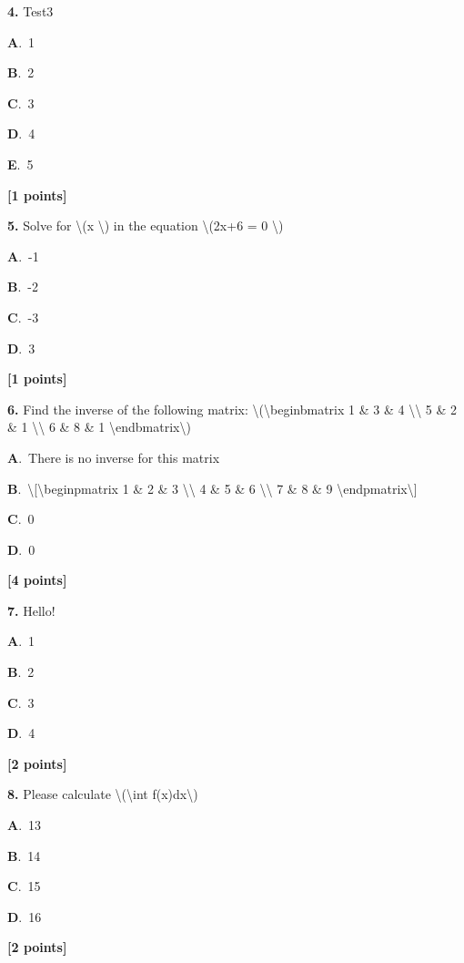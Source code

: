 \documentclass[12pt]{article}
\newcommand{\choice}[3]{%
  \noindent\textbf{#1}.~#2\hfill#3\par\vspace{0.25em}
}
\begin{document}
\noindent \textbf{\textenglish{4.}} {\textenglish{Test3}}

\noindent\choice{A}{{\textenglish{1}}}{}
\noindent\choice{B}{{\textenglish{2}}}{}
\noindent\choice{C}{{\textenglish{3}}}{}
\noindent\choice{D}{{\textenglish{4}}}{}
\noindent\choice{E}{{\textenglish{5}}}{}
\hfill \textbf{[1 points]}\vspace{0.5em}

\noindent \textbf{\textenglish{5.}} {\textenglish{Solve for \textbackslash{}(x \textbackslash{}) in the equation \textbackslash{}(2x+6 = 0 \textbackslash{})}}

\noindent\choice{A}{{\textenglish{-1}}}{}
\noindent\choice{B}{{\textenglish{-2}}}{}
\noindent\choice{C}{{\textenglish{-3}}}{}
\noindent\choice{D}{{\textenglish{3}}}{}
\hfill \textbf{[1 points]}\vspace{0.5em}

\noindent \textbf{\textenglish{6.}} {\textenglish{Find the inverse of the following matrix: \textbackslash{}(\textbackslash{}begin{bmatrix} 1 \& 3 \& 4 \textbackslash{}\textbackslash{} 5 \& 2 \& 1 \textbackslash{}\textbackslash{} 6 \& 8 \& 1 \textbackslash{}end{bmatrix}\textbackslash{})}}

\noindent\choice{A}{{\textenglish{There is no inverse for this matrix}}}{}
\noindent\choice{B}{{\textenglish{\textbackslash{}[\textbackslash{}begin{pmatrix} 1 \& 2 \& 3 \textbackslash{}\textbackslash{} 4 \& 5 \& 6 \textbackslash{}\textbackslash{} 7 \& 8 \& 9  \textbackslash{}end{pmatrix}\textbackslash{}]}}}{}
\noindent\choice{C}{{\textenglish{0}}}{}
\noindent\choice{D}{{\textenglish{0}}}{}
\hfill \textbf{[4 points]}\vspace{0.5em}

\noindent \textbf{\textenglish{7.}} {\textenglish{Hello!}}

\noindent\choice{A}{{\textenglish{1}}}{}
\noindent\choice{B}{{\textenglish{2}}}{}
\noindent\choice{C}{{\textenglish{3}}}{}
\noindent\choice{D}{{\textenglish{4}}}{}
\hfill \textbf{[2 points]}\vspace{0.5em}

\noindent \textbf{\textenglish{8.}} {\textenglish{Please calculate \textbackslash{}(\textbackslash{}int f(x)dx\textbackslash{})}}

\noindent\choice{A}{{\textenglish{13}}}{}
\noindent\choice{B}{{\textenglish{14}}}{}
\noindent\choice{C}{{\textenglish{15}}}{}
\noindent\choice{D}{{\textenglish{16}}}{}
\hfill \textbf{[2 points]}\vspace{0.5em}
\end{document}
